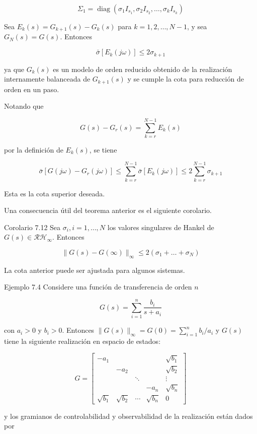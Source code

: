 $$
\Sigma_{1}=\operatorname{diag}\left(\sigma_{1} I_{s_{1}}, \sigma_{2} I_{s_{2}}, \ldots, \sigma_{k} I_{s_{k}}\right)
$$

Sea $E_{k}(s)=G_{k+1}(s)-G_{k}(s)$ para $k=1,2, \ldots, N-1$, y sea $G_{N}(s)=G(s)$. Entonces

$$
\bar{\sigma}\left[E_{k}(j \omega)\right] \leq 2 \sigma_{k+1}
$$

ya que $G_{k}(s)$ es un modelo de orden reducido obtenido de la realización internamente balanceada de $G_{k+1}(s)$ y se cumple la cota para reducción de orden en un paso.

Notando que

$$
G(s)-G_{r}(s)=\sum_{k=r}^{N-1} E_{k}(s)
$$

por la definición de $E_{k}(s)$, se tiene

$$
\bar{\sigma}\left[G(j \omega)-G_{r}(j \omega)\right] \leq \sum_{k=r}^{N-1} \bar{\sigma}\left[E_{k}(j \omega)\right] \leq 2 \sum_{k=r}^{N-1} \sigma_{k+1}
$$

Esta es la cota superior deseada.

Una consecuencia útil del teorema anterior es el siguiente corolario.

Corolario 7.12 Sea $\sigma_{i}, i=1, \ldots, N$ los valores singulares de Hankel de $G(s) \in \mathcal{R} \mathcal{H}_{\infty}$. Entonces

$$
\|G(s)-G(\infty)\|_{\infty} \leq 2\left(\sigma_{1}+\ldots+\sigma_{N}\right)
$$

La cota anterior puede ser ajustada para algunos sistemas.

Ejemplo 7.4 Considere una función de transferencia de orden $n$

$$
G(s)=\sum_{i=1}^{n} \frac{b_{i}}{s+a_{i}}
$$

con $a_{i}>0$ y $b_{i}>0$. Entonces $\|G(s)\|_{\infty}=G(0)=\sum_{i=1}^{n} b_{i} / a_{i}$ y $G(s)$ tiene la siguiente realización en espacio de estados:

$$
G=\left[\begin{array}{cccc|c}
-a_{1} & & & & \sqrt{b_{1}} \\
& -a_{2} & & & \sqrt{b_{2}} \\
& & \ddots & & \vdots \\
& & & -a_{n} & \sqrt{b_{n}} \\
\hline \sqrt{b_{1}} & \sqrt{b_{2}} & \cdots & \sqrt{b_{n}} & 0
\end{array}\right]
$$

y los gramianos de controlabilidad y observabilidad de la realización están dados por

